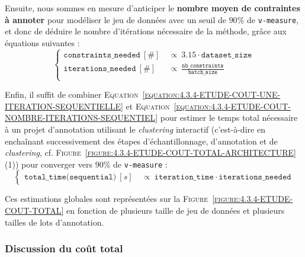 			Ensuite, nous sommes en mesure d'anticiper le \textbf{nombre moyen de contraintes à annoter} pour modéliser le jeu de données avec un seuil de $90$\% de \texttt{v-measure}, et donc de déduire le nombre d'itérations nécessaire de la méthode, grâce aux équations suivantes :
			\begin{equation}
				\label{equation:4.3.4-ETUDE-COUT-NOMBRE-ITERATIONS-SEQUENTIEL}
				\begin{cases}
					\texttt{constraints\_needed}~[\#] &
						~\propto~3.15 \cdot \texttt{dataset\_size} \\
					\texttt{iterations\_needed}~[\#] &
						~\propto~\frac{\texttt{nb\_constraints}}{\texttt{batch\_size}} \\
				\end{cases}
			\end{equation}
			
			Enfin, il suffit de combiner \textsc{Equation~\ref{equation:4.3.4-ETUDE-COUT-UNE-ITERATION-SEQUENTIELLE}} et \textsc{Equation~\ref{equation:4.3.4-ETUDE-COUT-NOMBRE-ITERATIONS-SEQUENTIEL}} pour estimer le temps total nécessaire à un projet d'annotation utilisant le \textit{clustering} interactif (c'est-à-dire en enchaînant successivement des étapes d'échantillonnage, d'annotation et de \textit{clustering}, cf. \textsc{Figure~\ref{figure:4.3.4-ETUDE-COUT-TOTAL-ARCHITECTURE}} (1)) pour converger vers $90$\% de \texttt{v-measure} :
			\begin{equation}
				\label{equation:4.3.4-ETUDE-COUT-TOTAL-SEQUENTIEL}
				\begin{cases}
					\texttt{total\_time(sequential)}~[s] &
						~\propto~\texttt{iteration\_time} \cdot \texttt{iterations\_needed}
				\end{cases}
			\end{equation}
			
			Ces estimations globales sont représentées sur la \textsc{Figure~\ref{figure:4.3.4-ETUDE-COUT-TOTAL}} en fonction de plusieurs taille de jeu de données et plusieurs tailles de lots d'annotation.

		\subsubsection{Discussion du coût total}
		
